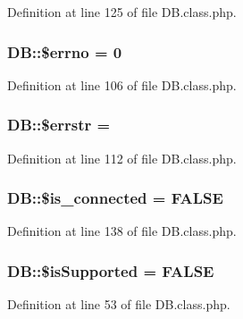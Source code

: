 Definition at line 125 of file D\+B.\+class.\+php.

\hypertarget{classDB_af99d759f7fb3bbadd579d72e686d1cf1}{}
\subsubsection[{\$errno}]{\setlength{\rightskip}{0pt plus 5cm}D\+B\+::\$errno = 0}\label{classDB_af99d759f7fb3bbadd579d72e686d1cf1}


Definition at line 106 of file D\+B.\+class.\+php.

\hypertarget{classDB_ae006f35821aba99713b834fa6a69e55b}{}
\subsubsection[{\$errstr}]{\setlength{\rightskip}{0pt plus 5cm}D\+B\+::\$errstr = \textquotesingle{}\textquotesingle{}}\label{classDB_ae006f35821aba99713b834fa6a69e55b}


Definition at line 112 of file D\+B.\+class.\+php.

\hypertarget{classDB_aac22b6ebcd8f78c2f70646d381f933dc}{}
\subsubsection[{\$is\+\_\+connected}]{\setlength{\rightskip}{0pt plus 5cm}D\+B\+::\$is\+\_\+connected = F\+A\+L\+S\+E}\label{classDB_aac22b6ebcd8f78c2f70646d381f933dc}


Definition at line 138 of file D\+B.\+class.\+php.

\hypertarget{classDB_a6b693edbdcdce5c86f42c050f62d8136}{}
\subsubsection[{\$is\+Supported}]{\setlength{\rightskip}{0pt plus 5cm}D\+B\+::\$is\+Supported = F\+A\+L\+S\+E\hspace{0.3cm}{\ttfamily [static]}}\label{classDB_a6b693edbdcdce5c86f42c050f62d8136}


Definition at line 53 of file D\+B.\+class.\+php.

\hypertarget{classDB_ad0a3ae175a659516131cfc6cd615d15c}{}
